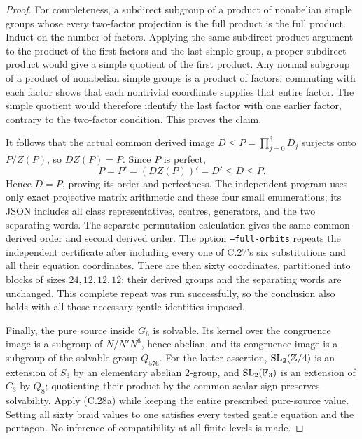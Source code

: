 \begin{proof}
For completeness, a subdirect subgroup of a product
of nonabelian simple groups whose every two-factor
projection is the full product is the full product.
Induct on the number of factors. Applying the same
subdirect-product argument to the product of the
first factors and the last simple group, a proper
subdirect product would give a simple quotient of
the first product. Any normal subgroup of a product
of nonabelian simple groups is a product of factors:
commuting with each factor shows that each nontrivial
coordinate supplies that entire factor. The simple
quotient would therefore identify the last factor
with one earlier factor, contrary to the two-factor
condition. This proves the claim.

It follows that the actual common derived image
\(D\leq P=\prod_{j=0}^3D_j\) surjects onto
\(P/Z(P)\), so \(DZ(P)=P\). Since \(P\) is perfect,
\[
 P=P'=(DZ(P))'=D'\leq D\leq P.
\]
Hence \(D=P\), proving its order and perfectness.
The independent program
uses only exact projective matrix arithmetic and
these four small enumerations; its JSON includes
all class representatives, centres, generators, and
the two separating words. The separate permutation
calculation  gives
the same common derived order and second derived order.
The option \texttt{--full-orbits} repeats the independent
certificate after including every one of C.27's six
substitutions and all their equation coordinates.
There are then sixty coordinates, partitioned into
blocks of sizes \(24,12,12,12\); their derived groups
and the separating words are unchanged. This complete
repeat was run successfully, so the conclusion also
holds with all those necessary gentle identities imposed.

Finally, the pure source inside \(G_6\) is solvable.
Its kernel over the congruence image is a subgroup
of \(N/N'N^6\), hence abelian, and its congruence
image is a subgroup of the solvable group
\(Q_{576}\). For the latter assertion,
\({\rm SL}_2(\mathbb Z/4)\) is an extension of
\(S_3\) by an elementary abelian 2-group, and
\({\rm SL}_2(\mathbb F_3)\) is an extension of
\(C_3\) by \(Q_8\); quotienting their product by
the common scalar sign preserves solvability.
Apply (C.28a) while keeping the entire prescribed
pure-source value. Setting all sixty braid values
to one satisfies every tested gentle equation and
the pentagon. No inference of compatibility at all
finite levels is made.
\end{proof}

